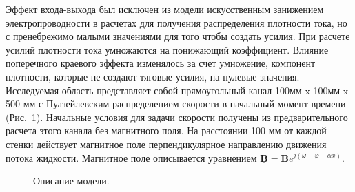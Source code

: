 Эффект входа-выхода был исключен из модели искусственным занижением электропроводности в расчетах для получения распределения плотности тока, но с пренебрежимо малыми значениями для того чтобы создать усилия. При расчете усилий плотности тока умножаются на понижающий коэффициент. Влияние поперечного краевого эффекта изменялось за счет умножение, компонент плотности, которые не создают тяговые усилия, на нулевые значения. Исследуемая область представляет собой прямоугольный канал 100мм x 100мм x 500 мм с Пуазейлевским распределением скорости в начальный момент времени (Рис.~\ref{fig:model}). Начальные условия для задачи скорости получены из предварительного расчета этого канала без магнитного поля. На расстоянии 100 мм от каждой стенки действует магнитное поле перпендикулярное направлению движения потока жидкости. Магнитное поле описывается уравнением $\underline{\mathbf{B}} = \mathbf{B} e^{j(\omega - \varphi - \alpha x)}$.
\begin{figure}[h]
	\caption{Описание модели.}
	\label{fig:model}
\end{figure}

